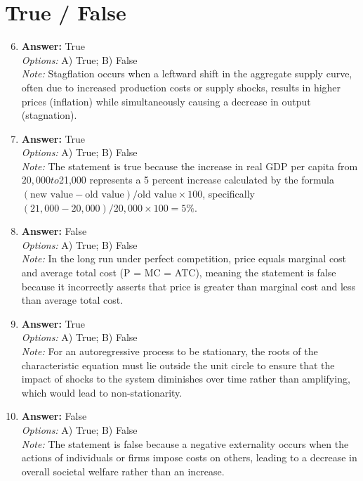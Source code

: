 \documentclass[12pt]{article}
\begin{document}
\section*{True / False}
\begin{enumerate}[label=\arabic*.]
\setcounter{enumi}{5}
\item \textbf{Answer:} True
\\ \textit{Options:} A) True; B) False
\\ \textit{Note:} Stagflation occurs when a leftward shift in the aggregate supply curve, often due to increased production costs or supply shocks, results in higher prices (inflation) while simultaneously causing a decrease in output (stagnation).
\item \textbf{Answer:} True
\\ \textit{Options:} A) True; B) False
\\ \textit{Note:} The statement is true because the increase in real GDP per capita from $20,000 to $21,000 represents a 5 percent increase calculated by the formula \((\text{new value} - \text{old value}) / \text{old value} \times 100\), specifically \((21,000 - 20,000) / 20,000 \times 100 = 5\%\).
\item \textbf{Answer:} False
\\ \textit{Options:} A) True; B) False
\\ \textit{Note:} In the long run under perfect competition, price equals marginal cost and average total cost (P = MC = ATC), meaning the statement is false because it incorrectly asserts that price is greater than marginal cost and less than average total cost.
\item \textbf{Answer:} True
\\ \textit{Options:} A) True; B) False
\\ \textit{Note:} For an autoregressive process to be stationary, the roots of the characteristic equation must lie outside the unit circle to ensure that the impact of shocks to the system diminishes over time rather than amplifying, which would lead to non-stationarity.
\item \textbf{Answer:} False
\\ \textit{Options:} A) True; B) False
\\ \textit{Note:} The statement is false because a negative externality occurs when the actions of individuals or firms impose costs on others, leading to a decrease in overall societal welfare rather than an increase.
\end{enumerate}
\end{document}
